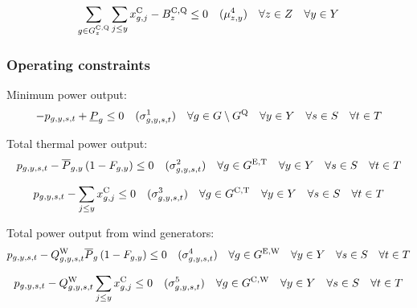 \documentclass{article}
\newcommand{\sScenarioSets}{\quad \forall \iYear \in \sYears \quad \forall \iScenario \in \sScenarios \quad \forall \iInterval \in \sIntervals}
\begin{document}

\begin{equation}
	\sum\limits_{\iGenerator \in \sStorageCandidate_{\iZone}}  \sum\limits_{\iYearAlias \leq \iYear} \vInstalledCapacity[\iGenerator,\iYearAlias] - \cBuildLimitStorage \leq 0  \quad (\dStorageBuildLimit) \quad \forall \iZone \in \sZones \quad \forall \iYear \in \sYears
\end{equation}

\subsubsection{Operating constraints}
Minimum power output:
\begin{equation}
	-\vPower + \cPowerOutputMin \leq 0 \quad (\dMinPowerOutput) \quad \forall \iGenerator \in \sGenerators \setminus \sStorage \sScenarioSets
\end{equation}

Total thermal power output:
\begin{equation}
	\vPower - \cPowerOutputMax \left(1 - \cRetirementIndicator\right) \leq 0 \quad (\dMaxPowerOutputExistingThermal) \quad \forall \iGenerator \in \sGeneratorsExistingThermal \sScenarioSets
\end{equation}

\begin{equation}
	\vPower - \sum\limits_{\iYearAlias \leq \iYear} \vInstalledCapacity[\iGenerator,\iYearAlias] \leq 0 \quad (\dMaxPowerOutputCandidateThermal) \quad \forall \iGenerator \in \sGeneratorsCandidateThermal \sScenarioSets
\end{equation}

Total power output from wind generators:
\begin{equation}
	\vPower - \cCapacityFactorWind \cPowerOutputMax[\iGenerator] \left(1 - \cRetirementIndicator\right) \leq 0 \quad (\dMaxPowerOutputWindExisting) \quad \forall \iGenerator \in \sGeneratorsExistingWind \sScenarioSets
\end{equation}

\begin{equation}
	\vPower - \cCapacityFactorWind \sum\limits_{\iYearAlias \leq \iYear} \vInstalledCapacity[\iGenerator,\iYearAlias] \leq 0 \quad (\dMaxPowerOutputWindCandidate) \quad \forall \iGenerator \in \sGeneratorsCandidateWind \sScenarioSets
\end{equation}
\end{document}
